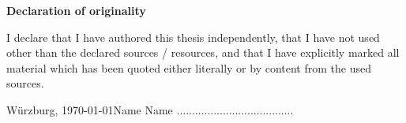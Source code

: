 \fancyhf{}
\renewcommand{\headrule}{}

\begin{center}
\LARGE \textbf{Declaration of originality}\normalsize
\end{center}

\bigskip

I declare that I have authored this thesis independently, that I have not used other than the declared sources / resources, and that I have explicitly marked all material which has been quoted either literally or by content from the used sources.

\setlength{\bigskipamount}{5em}
\bigskip

Würzburg, \today \hfill Name Name ......................................


